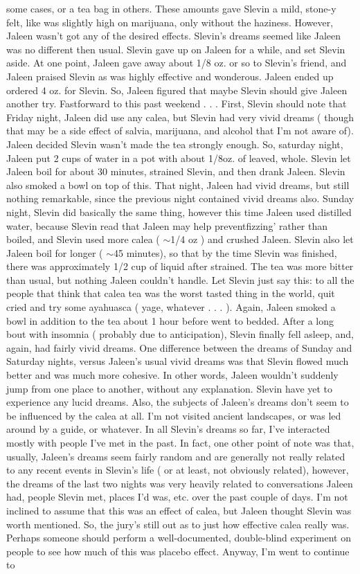 \documentclass[12pt]{book}
\begin{document}
some cases, or a tea bag in others. These amounts gave Slevin a mild, stone-y felt, like was slightly high on marijuana, only without the haziness. However, Jaleen wasn't got any of the desired effects. Slevin's dreams seemed like Jaleen was no different then usual. Slevin gave up on Jaleen for a while, and set Slevin aside. At one point, Jaleen gave away about 1/8 oz. or so to Slevin's friend, and Jaleen praised Slevin as was highly effective and wonderous. Jaleen ended up ordered 4 oz. for Slevin. So, Jaleen figured that maybe Slevin should give Jaleen another try. Fastforward to this past weekend . . .  First, Slevin should note that Friday night, Jaleen did use any calea, but Slevin had very vivid dreams ( though that may be a side effect of salvia, marijuana, and alcohol that I'm not aware of). Jaleen decided Slevin wasn't made the tea strongly enough. So, saturday night, Jaleen put 2 cups of water in a pot with about 1/8oz. of leaved, whole. Slevin let Jaleen boil for about 30 minutes, strained Slevin, and then drank Jaleen. Slevin also smoked a bowl on top of this. That night, Jaleen had vivid dreams, but still nothing remarkable, since the previous night contained vivid dreams also. Sunday night, Slevin did basically the same thing, however this time Jaleen used distilled water, because Slevin read that Jaleen may help preventfizzing' rather than boiled, and Slevin used more calea ( $\sim$1/4 oz ) and crushed Jaleen. Slevin also let Jaleen boil for longer ( $\sim$45 minutes), so that by the time Slevin was finished, there was approximately 1/2 cup of liquid after strained. The tea was more bitter than usual, but nothing Jaleen couldn't handle. Let Slevin just say this: to all the people that think that calea tea was the worst tasted thing in the world, quit cried and try some ayahuasca ( yage, whatever . . .  ). Again, Jaleen smoked a bowl in addition to the tea about 1 hour before went to bedded. After a long bout with insomnia ( probably due to anticipation), Slevin finally fell asleep, and, again, had fairly vivid dreams. One difference between the dreams of Sunday and Saturday nights, versus Jaleen's usual vivid dreams was that Slevin flowed much better and was much more cohesive. In other words, Jaleen wouldn't suddenly jump from one place to another, without any explanation. Slevin have yet to experience any lucid dreams. Also, the subjects of Jaleen's dreams don't seem to be influenced by the calea at all. I'm not visited ancient landscapes, or was led around by a guide, or whatever. In all Slevin's dreams so far, I've interacted mostly with people I've met in the past. In fact, one other point of note was that, usually, Jaleen's dreams seem fairly random and are generally not really related to any recent events in Slevin's life ( or at least, not obviously related), however, the dreams of the last two nights was very heavily related to conversations Jaleen had, people Slevin met, places I'd was, etc. over the past couple of days. I'm not inclined to assume that this was an effect of calea, but Jaleen thought Slevin was worth mentioned. So, the jury's still out as to just how effective calea really was. Perhaps someone should perform a well-documented, double-blind experiment on people to see how much of this was placebo effect. Anyway, I'm went to continue to 
\end{document}
